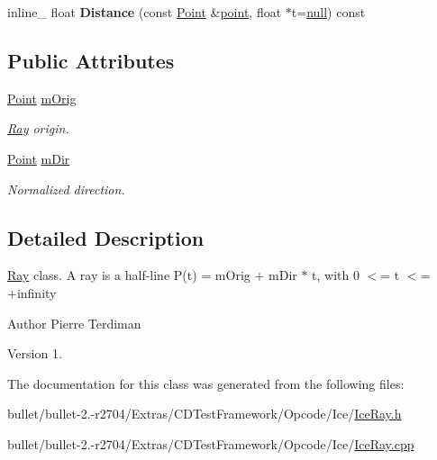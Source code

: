 \begin{DoxyCompactItemize}
\item 
\hypertarget{class_ray_af5e5523d4880544f197cb08bcde3e96e}{inline\+\_\+ float {\bfseries Distance} (const \hyperlink{class_point}{Point} \&\hyperlink{structpoint}{point}, float $\ast$t=\hyperlink{_ice_types_8h_ac97b8ee753e4405397a42ad5799b0f9e}{null}) const }\label{class_ray_af5e5523d4880544f197cb08bcde3e96e}

\end{DoxyCompactItemize}
\subsection*{Public Attributes}
\begin{DoxyCompactItemize}
\item 
\hypertarget{class_ray_a9744c280ecde5650fd67a3c000444b28}{\hyperlink{class_point}{Point} \hyperlink{class_ray_a9744c280ecde5650fd67a3c000444b28}{m\+Orig}}\label{class_ray_a9744c280ecde5650fd67a3c000444b28}

\begin{DoxyCompactList}\small\item\em \hyperlink{class_ray}{Ray} origin. \end{DoxyCompactList}\item 
\hypertarget{class_ray_aecb4e4aab5531c3f2e193c0f9293f5fc}{\hyperlink{class_point}{Point} \hyperlink{class_ray_aecb4e4aab5531c3f2e193c0f9293f5fc}{m\+Dir}}\label{class_ray_aecb4e4aab5531c3f2e193c0f9293f5fc}

\begin{DoxyCompactList}\small\item\em Normalized direction. \end{DoxyCompactList}\end{DoxyCompactItemize}


\subsection{Detailed Description}
\hyperlink{class_ray}{Ray} class. A ray is a half-\/line P(t) = m\+Orig + m\+Dir $\ast$ t, with 0 $<$= t $<$= +infinity

\begin{DoxyAuthor}{Author}
Pierre Terdiman 
\end{DoxyAuthor}
\begin{DoxyVersion}{Version}
1. 
\end{DoxyVersion}


The documentation for this class was generated from the following files\+:\begin{DoxyCompactItemize}
\item 
bullet/bullet-\/2.-\/r2704/\+Extras/\+C\+D\+Test\+Framework/\+Opcode/\+Ice/\hyperlink{_ice_ray_8h}{Ice\+Ray.\+h}\item 
bullet/bullet-\/2.-\/r2704/\+Extras/\+C\+D\+Test\+Framework/\+Opcode/\+Ice/\hyperlink{_ice_ray_8cpp}{Ice\+Ray.\+cpp}\end{DoxyCompactItemize}

